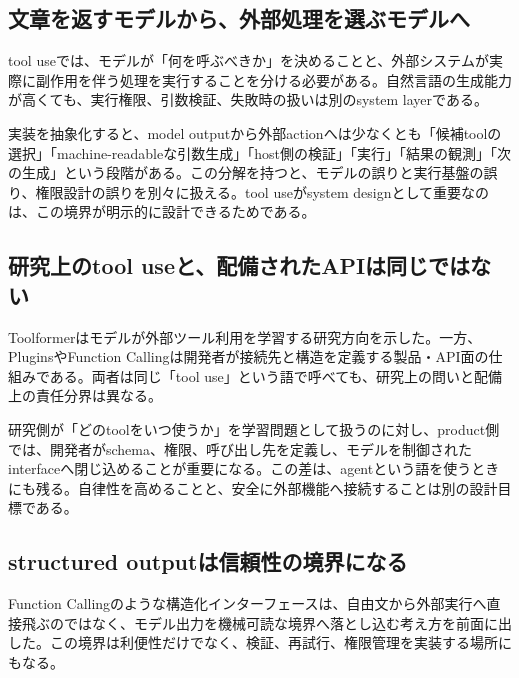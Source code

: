 
\subsection{文章を返すモデルから、外部処理を選ぶモデルへ}

tool useでは、モデルが「何を呼ぶべきか」を決めることと、外部システムが実際に副作用を伴う処理を実行することを分ける必要がある。自然言語の生成能力が高くても、実行権限、引数検証、失敗時の扱いは別のsystem layerである。\autocite{src-150e07b331df,src-4de1cea0a896,src-6b76b870b4ae,src-97786632d087,src-e17d0bf10781}


実装を抽象化すると、model outputから外部actionへは少なくとも「候補toolの選択」「machine-readableな引数生成」「host側の検証」「実行」「結果の観測」「次の生成」という段階がある。この分解を持つと、モデルの誤りと実行基盤の誤り、権限設計の誤りを別々に扱える。tool useがsystem designとして重要なのは、この境界が明示的に設計できるためである。\autocite{src-150e07b331df,src-4de1cea0a896,src-6b76b870b4ae,src-97786632d087,src-e17d0bf10781}


\subsection{研究上のtool useと、配備されたAPIは同じではない}

Toolformerはモデルが外部ツール利用を学習する研究方向を示した。一方、PluginsやFunction Callingは開発者が接続先と構造を定義する製品・API面の仕組みである。両者は同じ「tool use」という語で呼べても、研究上の問いと配備上の責任分界は異なる。\autocite{src-150e07b331df,src-4de1cea0a896,src-6b76b870b4ae,src-97786632d087,src-e17d0bf10781}


研究側が「どのtoolをいつ使うか」を学習問題として扱うのに対し、product側では、開発者がschema、権限、呼び出し先を定義し、モデルを制御されたinterfaceへ閉じ込めることが重要になる。この差は、agentという語を使うときにも残る。自律性を高めることと、安全に外部機能へ接続することは別の設計目標である。\autocite{src-150e07b331df,src-4de1cea0a896,src-6b76b870b4ae,src-97786632d087,src-e17d0bf10781}


\subsection{structured outputは信頼性の境界になる}

Function Callingのような構造化インターフェースは、自由文から外部実行へ直接飛ぶのではなく、モデル出力を機械可読な境界へ落とし込む考え方を前面に出した。この境界は利便性だけでなく、検証、再試行、権限管理を実装する場所にもなる。\autocite{src-4de1cea0a896,src-6b76b870b4ae,src-97786632d087,src-e17d0bf10781}


